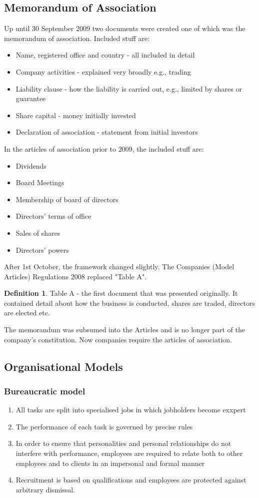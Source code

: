 \documentclass[a4paper]{article}
\theoremstyle{plain}
\theoremstyle{definition}
\newtheorem{defn}{Definition}[section]
\theoremstyle{remark}
\begin{document}
\subsection{Memorandum of Association}
Up until 30 September 2009 two documents were created one of which was the memorandum of association. Included stuff are:
\begin{itemize}
	\item Name, registered office and country - all included in detail
	\item Company activities - explained very broadly e.g., trading
	\item Liability clause - how the liability is carried out, e.g., limited by shares or guarantee
	\item Share capital - money initially invested
	\item Declaration of association - statement from initial investors
\end{itemize}
In the articles of association prior to $2009$, the included stuff are:
\begin{itemize}
	\item Dividends
	\item Board Meetings
	\item Membership of board of directors
	\item Directors' terms of office
	\item Sales of shares
	\item Directors' powers
\end{itemize}
After 1st October, the framework changed slightly. The Companies (Model Articles) Regulations 2008 replaced "Table A".
\begin{defn}
	Table A - the first document that was presented originally. It contained detail about how the business is conducted, shares are traded, directors are elected etc.
\end{defn}
The memorandum was subsumed into the Articles and is no longer part of the company's constitution. Now companies require the articles of association.
\subsection{Organisational Models}
\subsubsection{Bureaucratic model}
\begin{enumerate}
	\item All tasks are split into specialised jobs in which jobholders become exxpert
	\item The performance of each task is governed by precise rules
	\item In order to ensure that personalities and personal relationships do not interfere with performance, employees are required to relate both to other employees and to clients in an impersonal and formal manner
	\item Recruitment is based on qualifications and employees are protected against arbitrary dismissal.
\end{enumerate}
\end{document}
